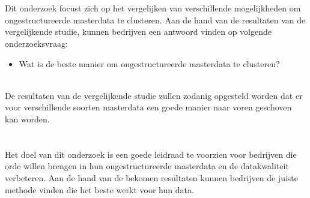 \section{}%
\label{sec:onderzoeksvraag}
Dit onderzoek focust zich op het vergelijken van verschillende mogelijkheden om ongestructureerde masterdata te clusteren. Aan de hand van de resultaten van de vergelijkende studie, kunnen bedrijven een antwoord vinden op volgende onderzoeksvraag:
\begin{itemize}
    \item Wat is de beste manier om ongestructureerde masterdata te clusteren?
\end{itemize}
\\\indent
De resultaten van de vergelijkende studie zullen zodanig opgesteld worden dat er voor verschillende soorten masterdata een goede manier naar voren geschoven kan worden.


\section{}%
\label{sec:onderzoeksdoelstelling}
Het doel van dit onderzoek is een goede leidraad te voorzien voor bedrijven die orde willen brengen in hun ongestructureerde masterdata en de datakwaliteit verbeteren. Aan de hand van de bekomen resultaten kunnen bedrijven de juiste methode vinden die het beste werkt voor hun data.

\section{}%
\label{sec:opzet-bachelorproef}

